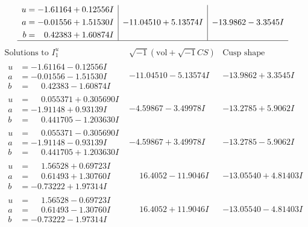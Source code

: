 \documentclass[1p]{elsarticle_modified}
\theoremstyle{definition}
\newcommand{\I}{\sqrt{-1}}
\begin{document}
$$\begin{array}{c|c|c}
\begin{aligned}
u &= -1.61164 + 0.12556 I \\
a &= -0.01556 + 1.51530 I \\
b &= \phantom{-}0.42383 + 1.60874 I\end{aligned}
 & -11.04510 + 5.13574 I & -13.9862 - 3.3545 I\\
 \hline 
 \end{array}$$\newpage$$\begin{array}{c|c|c}  
\text{Solutions to }I^u_{1}& \I (\text{vol} + \sqrt{-1}CS) & \text{Cusp shape}\\
 \hline 
\begin{aligned}
u &= -1.61164 - 0.12556 I \\
a &= -0.01556 - 1.51530 I \\
b &= \phantom{-}0.42383 - 1.60874 I\end{aligned}
 & -11.04510 - 5.13574 I & -13.9862 + 3.3545 I \\ \hline\begin{aligned}
u &= \phantom{-}0.055371 + 0.305690 I \\
a &= -1.91148 + 0.93139 I \\
b &= \phantom{-}0.441705 - 1.203630 I\end{aligned}
 & -4.59867 - 3.49978 I & -13.2785 + 5.9062 I \\ \hline\begin{aligned}
u &= \phantom{-}0.055371 - 0.305690 I \\
a &= -1.91148 - 0.93139 I \\
b &= \phantom{-}0.441705 + 1.203630 I\end{aligned}
 & -4.59867 + 3.49978 I & -13.2785 - 5.9062 I \\ \hline\begin{aligned}
u &= \phantom{-}1.56528 + 0.69723 I \\
a &= \phantom{-}0.61493 + 1.30760 I \\
b &= -0.73222 + 1.97314 I\end{aligned}
 & \phantom{-}16.4052 - 11.9046 I & -13.05540 + 4.81403 I \\ \hline\begin{aligned}
u &= \phantom{-}1.56528 - 0.69723 I \\
a &= \phantom{-}0.61493 - 1.30760 I \\
b &= -0.73222 - 1.97314 I\end{aligned}
 & \phantom{-}16.4052 + 11.9046 I & -13.05540 - 4.81403 I \\ \hline\begin{aligned}

\end{aligned}
\end{array}$$
\end{document}
